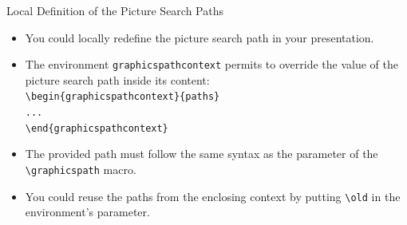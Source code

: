 \documentclass[english,sectioncirclenumberstyle]{ciadbeamer}
\begin{document}
\begin{frame}{Local Definition of the Picture Search Paths}
	\begin{itemize}
	\item You could locally redefine the picture search path in your presentation.
	\item The environment \texttt{graphicspathcontext} permits to override the value of the picture search path inside its content: \\
			\texttt{{\textbackslash}begin\{graphicspathcontext\}\{paths\}} \\
			\texttt{...} \\
			\texttt{{\textbackslash}end\{graphicspathcontext\}}
	\item The provided path must follow the same syntax as the parameter of the \texttt{{\textbackslash}graphicspath} macro.
	\item You could reuse the paths from the enclosing context by putting \texttt{{\textbackslash}old} in the environment's parameter. \\
	\end{itemize}
\end{frame}
\end{document}
